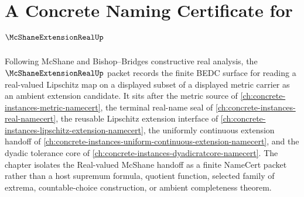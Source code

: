 \chapter{A Concrete Naming Certificate for $\McShaneExtensionRealUp$}
\label{ch:concrete-instances-mcshane-extension-real-namecert}

Following McShane and Bishop--Bridges constructive real analysis, the $\McShaneExtensionRealUp$ packet records the finite BEDC surface for reading a real-valued Lipschitz map on a displayed subset of a displayed metric carrier as an ambient extension candidate. It sits after the metric source of \autoref{ch:concrete-instances-metric-namecert}, the terminal real-name seal of \autoref{ch:concrete-instances-real-namecert}, the reusable Lipschitz extension interface of \autoref{ch:concrete-instances-lipschitz-extension-namecert}, the uniformly continuous extension handoff of \autoref{ch:concrete-instances-uniform-continuous-extension-namecert}, and the dyadic tolerance core of \autoref{ch:concrete-instances-dyadicratcore-namecert}. The chapter isolates the Real-valued McShane handoff as a finite NameCert packet rather than a host supremum formula, quotient function, selected family of extrema, countable-choice construction, or ambient completeness theorem.

